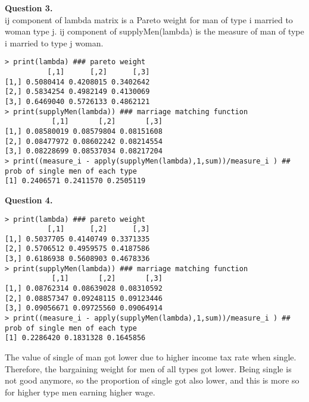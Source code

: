 \documentclass[paper=a4, fontsize=13pt]{extarticle} %
\numberwithin{equation}{section} %
\numberwithin{figure}{section} %
\numberwithin{table}{section} %
\begin{document}
\vspace{0.2in}
\textbf{Question 3.}\\
ij component of lambda matrix is a Pareto weight for man of type i married to woman type j. ij component of supplyMen(lambda) is the measure of man of type i married to type j woman. 
\begin{lstlisting}
> print(lambda) ### pareto weight
          [,1]      [,2]      [,3]
[1,] 0.5080414 0.4208015 0.3402642
[2,] 0.5834254 0.4982149 0.4130069
[3,] 0.6469040 0.5726133 0.4862121
> print(supplyMen(lambda)) ### marriage matching function
           [,1]       [,2]       [,3]
[1,] 0.08580019 0.08579804 0.08151608
[2,] 0.08477972 0.08602242 0.08214554
[3,] 0.08228699 0.08537034 0.08217204
> print((measure_i - apply(supplyMen(lambda),1,sum))/measure_i ) ## prob of single men of each type
[1] 0.2406571 0.2411570 0.2505119
\end{lstlisting}

\textbf{Question 4.} \\
\begin{lstlisting}
> print(lambda) ### pareto weight
          [,1]      [,2]      [,3]
[1,] 0.5037705 0.4140749 0.3371335
[2,] 0.5706512 0.4959575 0.4187586
[3,] 0.6186938 0.5608903 0.4678336
> print(supplyMen(lambda)) ### marriage matching function
           [,1]       [,2]       [,3]
[1,] 0.08762314 0.08639028 0.08310592
[2,] 0.08857347 0.09248115 0.09123446
[3,] 0.09056671 0.09725560 0.09064914
> print((measure_i - apply(supplyMen(lambda),1,sum))/measure_i ) ## prob of single men of each type
[1] 0.2286420 0.1831328 0.1645856
\end{lstlisting}
The value of single of man got lower due to higher income tax rate when single. Therefore, the bargaining weight for men of all types got lower. Being single is not good anymore, so the proportion of single got also lower, and this is more so for higher type men earning higher wage.
\end{document}
